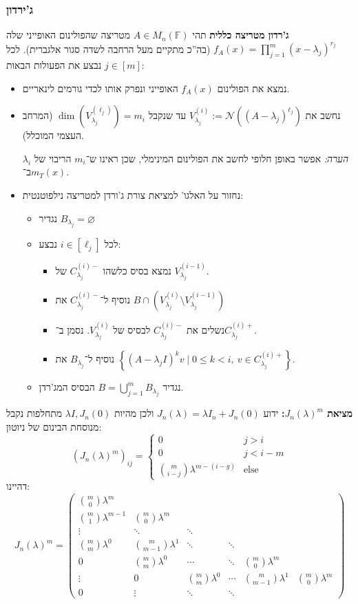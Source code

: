 \documentclass[a4paper]{article}
\newcommand\ml    {\ell}
\newcommand\nc    {\mathcal{N}}
\newcommand\other {\text{else}}
\newcommand\F         {\mathbb{F}}
\newcommand\pms[1]    {\begin{pmatrix}
		#1
\end{pmatrix}}
\renewcommand\lg      {\lambda}
\newcommand\cl [1]    {\left ( #1 \right )}
\newcommand\ccb[1]    {\left \{ #1 \right \}}
\theoremstyle{definition}
\begin{document}
	\subsubsection{ג'ירדון}
	\textbf{ג'רדון מטריצה כללית}
	תהי $A \in M_n(\F)$ מטריצה שהפולינום האופייני שלה $f_A(x) = \prod_{j = 1}^{m}(x - \lg_j)^{r_j}$ (בה''כ מתקיים מעל הרחבה לשדה סגור אלגברית). לכל $j \in [m]$ נבצע את הפעולות הבאות: 
	\begin{itemize}
		\item נמצא את הפולינום $f_A(x)$ האופייני ונפרק אותו לכדי גורמים לינאריים. 
		\item נחשב את $V_{\lg_j}^{(i)} := \nc((A - \lg_j)^{\ell_j})$ עד שנקבל $\dim\cl{V_{\lg_j}^{(\ml_j)}} = m_i$ (המרחב העצמי המוכלל). 
		
		\textit{הערה: }אפשר באופן חלופי לחשב את הפולינום המינימלי, שכן ראינו ש־$m_i$ הריבוי של $\lg_i$ ב־$m_T(x)$. 
		\item נחזור על האלגו' למציאת צורת ג'ורדן למטריצה נילפוטנטית: 
		\begin{itemize}
			\item נגדיר $B_{\lg_j} = \varnothing$
			\item לכל $i \in [\ell_j]$ נבצע: 
			\begin{itemize}
				\item נמצא בסיס כלשהו $C_{\lg_j}^{(i)-}$ של $V_{\lg_j}^{(i - 1)}$. 
				\item נוסיף ל־$C_{\lg_j}^{(i)-}$ את $B \cap (V_{\lg_j}^{(i)} \setminus V_{\lg_j}^{(i - 1)})$
				\item נשלים את $C_{\lg_j}^{(i)-}$ לבסיס של $V_{\lg_j}^{(i)}$. נסמן ב־$C_{\lg_j}^{(i)+}$. 
				\item נוסיף ל־$B_{\lg_j}$ את $\ccb{(A - \lg_jI)^{k}v \mid 0 \le k < i, \ v \in C_{\lg_j}^{(i)+}}$. 
			\end{itemize}
			\item נגדיר $B = \bigcup_{j = 1}^{m} B_{\lg_j}$ הבסיס המג'רדן. 
		\end{itemize}
	\end{itemize}
	
	\textbf{מציאת $J_n(\lg)^{m}$: }ידוע $J_n(\lg) = \lg I_n + J_n(0)$ ולכן מהיות $\lg I, J_n(0)$ מתחלפות נקבל מנוסחת הבינום של ניוטון: 
	\[ (J_n(\lg)^{m})_{ij} = \begin{cases}
		0 & j > i \\ 0 & j < i - m \\ \binom{m}{i - j}\lg^{m - (i - g)} & \other
	\end{cases} \]
	דהיינו: 
	\[ J_n(\lg)^{m} = \pms{
		\binom{m}{0}\lg^{m} \\ 
		\binom{m}{1}\lg^{m - 1} & \binom{m}{0}\lg^{m} \\
		\vdots & \ddots & \ddots \\
		\binom{m}{m}\lg^{0} & \binom{m}{m - 1}\lg^{1} &\ddots& \ddots \\
		0 & \binom{m}{m}\lg^{0} &\cdots&\ddots& \binom{m}{0}\lg^{m} \\
		\vdots & 0 & \binom{m}{m}\lg^{0} &\cdots& \binom{m}{m - 1}\lg^{1} & \binom{m}{0}\lg^{m} \\
		0 & \vdots & \ddots & \ddots
	} \]
\end{document}
